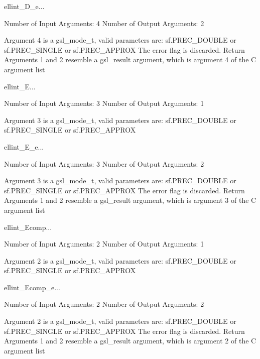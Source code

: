 \begin{funcdesc}{ellint_D_e}{...}

    Number of Input  Arguments:  4
    Number of Output Arguments:  2

 Argument 4 is a gsl_mode_t, valid parameters are:
	sf.PREC_DOUBLE or sf.PREC_SINGLE or sf.PREC_APPROX
The error flag is discarded.
Return Arguments 1 and 2 resemble a gsl_result argument,
	which is  argument 4 of the C argument list

\end{funcdesc}

\begin{funcdesc}{ellint_E}{...}

    Number of Input  Arguments:  3
    Number of Output Arguments:  1

 Argument 3 is a gsl_mode_t, valid parameters are:
	sf.PREC_DOUBLE or sf.PREC_SINGLE or sf.PREC_APPROX

\end{funcdesc}

\begin{funcdesc}{ellint_E_e}{...}

    Number of Input  Arguments:  3
    Number of Output Arguments:  2

 Argument 3 is a gsl_mode_t, valid parameters are:
	sf.PREC_DOUBLE or sf.PREC_SINGLE or sf.PREC_APPROX
The error flag is discarded.
Return Arguments 1 and 2 resemble a gsl_result argument,
	which is  argument 3 of the C argument list

\end{funcdesc}

\begin{funcdesc}{ellint_Ecomp}{...}

    Number of Input  Arguments:  2
    Number of Output Arguments:  1

 Argument 2 is a gsl_mode_t, valid parameters are:
	sf.PREC_DOUBLE or sf.PREC_SINGLE or sf.PREC_APPROX

\end{funcdesc}

\begin{funcdesc}{ellint_Ecomp_e}{...}

    Number of Input  Arguments:  2
    Number of Output Arguments:  2

 Argument 2 is a gsl_mode_t, valid parameters are:
	sf.PREC_DOUBLE or sf.PREC_SINGLE or sf.PREC_APPROX
The error flag is discarded.
Return Arguments 1 and 2 resemble a gsl_result argument,
	which is  argument 2 of the C argument list

\end{funcdesc}

